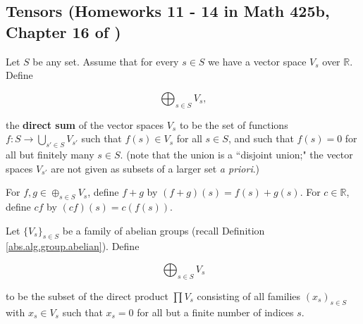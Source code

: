 %
%
%
%
%
%
%
%

\subsection{Tensors (Homeworks 11 - 14 in Math 425b, Chapter 16 of \citet{lang2005algebra})}\label{ra.sec.tensors}

\begin{definition}

Let \(S\) be any set. Assume that for every \(s \in S\) we have a vector space \(V_s\) over \(\mathbb{R}\). Define 

\[
\bigoplus_{s \in S} V_s,
\]

the \textbf{direct sum} of the vector spaces \(V_s\) to be the set of functions \(f: S \to \bigcup_{s' \in S} V_{s'}\) such that \(f(s) \in V_s\) for all \(s \in S\), and such that \(f(s) = 0\) for all but finitely many \(s \in S\). (note that the union is a ``disjoint union;" the vector spaces \(V_{s'}\) are not given as subsets of a larger set \textit{a priori}.)

For \(f, g \in \oplus_{s \in S} V_s\), define \(f + g\) by \((f+g)(s) = f(s) + g(s)\). For \(c \in \mathbb{R}\), define \(cf\) by \((cf)(s) = c(f(s))\). 

\end{definition}

\begin{definition}

 Let \(\{V_s\}_{s \in S}\) be a family of abelian groups (recall Definition \ref{abs.alg.group.abelian}). Define
 
 \[
\bigoplus_{s \in S} V_s
\]

to be the subset of the direct product \(\prod V_s\) consisting of all families \((x_s)_{s \in S}\) with \(x_s \in V_s\) such that \(x_s = 0\) for all but a finite number of indices \(s\).

\end{definition}

